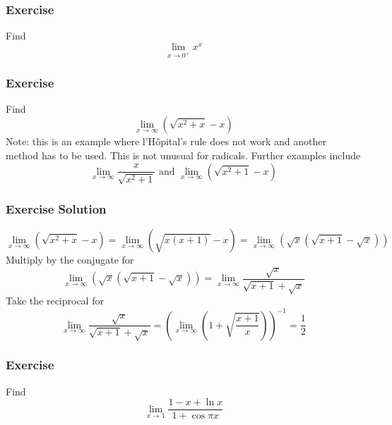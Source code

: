 \documentclass[xcolor=dvipsnames]{beamer}
\begin{document}
\begin{frame}
  \frametitle{Exercise}
  {\ubung} Find
  \begin{equation}
    \label{eq:mahpeilu}
    \lim_{x\rightarrow{}0^{+}}x^{x}
  \end{equation}
\end{frame}

\begin{frame}
  \frametitle{Exercise}
  {\ubung} Find
  \begin{equation}
    \label{eq:eigahrai}
    \lim_{x\rightarrow\infty}(\sqrt{x^{2}+x}-x)
  \end{equation}
  Note: this is an example where l'H{\^o}pital's rule does not work
  and another method has to be used. This is not unusual for radicals.
  Further examples include
  \begin{equation}
    \label{eq:pahxoquu}
    \lim_{x\rightarrow{}\infty}\frac{x}{\sqrt{x^{2}+1}}\mbox{ and }\lim_{x\rightarrow\infty}(\sqrt{x^{2}+1}-x)
  \end{equation}
\end{frame}

\begin{frame}
  \frametitle{Exercise Solution}
  \begin{equation}
    \label{eq:erahdahv}
    \lim_{x\rightarrow\infty}(\sqrt{x^{2}+x}-x)=\lim_{x\rightarrow\infty}(\sqrt{x(x+1)}-x)=\lim_{x\rightarrow\infty}(\sqrt{x}(\sqrt{x+1}-\sqrt{x}))
  \end{equation}
  Multiply by the conjugate for
  \begin{equation}
    \label{eq:heetheer}
    \lim_{x\rightarrow\infty}(\sqrt{x}(\sqrt{x+1}-\sqrt{x}))=\lim_{x\rightarrow{}\infty}\frac{\sqrt{x}}{\sqrt{x+1}+\sqrt{x}}
  \end{equation}
  Take the reciprocal for
  \begin{equation}
    \label{eq:quahgoec}
    \lim_{x\rightarrow{}\infty}\frac{\sqrt{x}}{\sqrt{x+1}+\sqrt{x}}=\left(\lim_{x\rightarrow{}\infty}\left(1+\sqrt{\frac{x+1}{x}}\right)\right)^{-1}=\frac{1}{2}
  \end{equation}
\end{frame}

\begin{frame}
  \frametitle{Exercise}
  {\ubung} Find
  \begin{equation}
    \label{eq:vuciecha}
    \lim_{x\rightarrow{}1}\frac{1-x+\ln{}x}{1+\cos\pi{}x}
  \end{equation}
\end{frame}
\end{document}
